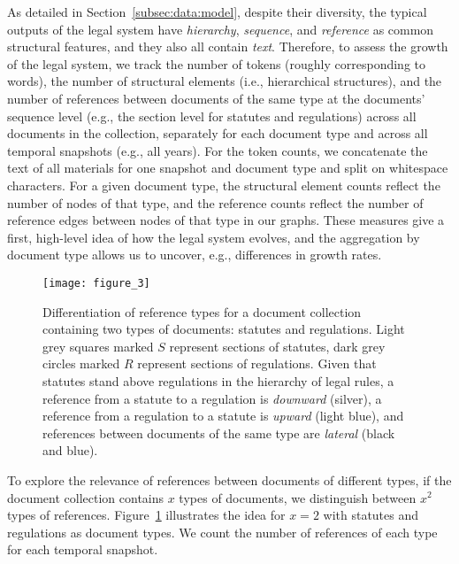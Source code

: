 As detailed in Section~\ref{subsec:data:model}, despite their diversity, the typical outputs of the legal system have \emph{hierarchy}, \emph{sequence}, and \emph{reference} as common structural features, and they also all contain \emph{text}. 
Therefore, to assess the growth of the legal system, we track the number of tokens (roughly corresponding to words), the number of structural elements (i.e., hierarchical structures), and the number of references between documents of the same type at the documents' sequence level (e.g., the section level for statutes and regulations) across all documents in the collection, separately for each document type and across all temporal snapshots (e.g., all years). 
For the token counts, we concatenate the text of all materials for one snapshot and document type and split on whitespace characters. 
For a given document type, the structural element counts reflect the number of nodes of that type, and the reference counts reflect the number of reference edges between nodes of that type in our graphs.
These measures give a first, high-level idea of how the legal system evolves, and the aggregation by document type allows us to uncover, e.g., differences in growth rates. 

\begin{figure} 
	\centering
	\texttt{[image: figure\_3]}
	\caption{Differentiation of reference types for a document collection containing two types of documents: statutes and regulations. 
	Light grey squares marked $S$ represent sections of statutes, dark grey circles marked $R$ represent sections of regulations. 
	Given that statutes stand above regulations in the hierarchy of legal rules, 
	a reference from a statute to a regulation is \emph{downward} (silver), a reference from a regulation to a statute is \emph{upward} (light blue), 
	and references between documents of the same type are \emph{lateral} (black and blue).}\label{fig:crossref-differentiation}
\end{figure}

To explore the relevance of references between documents of different types, if the document collection contains $x$ types of documents, we distinguish between $x^2$ types of references. 
Figure~\ref{fig:crossref-differentiation} illustrates the idea for $x = 2$ with statutes and regulations as document types.
We count the number of references of each type for each temporal snapshot.

